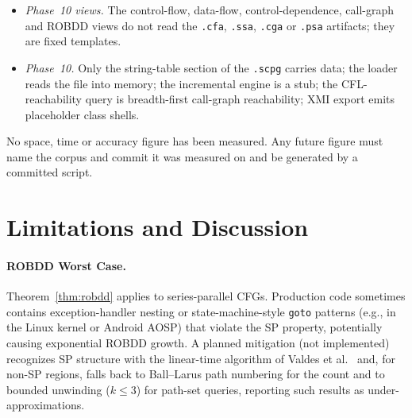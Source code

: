 \documentclass[journal,10pt,twoside]{IEEEtran}
\begin{document}
\begin{itemize}
  fixed templates; the composite-structure, object,
  communication and interaction-overview extractors produce no
  output.  The activity view maps every CFG edge to an
  unguarded control edge, discarding true/false, exception,
  switch and loop-back labels, and produces no decision, merge,
  fork or join nodes.  The sequence view expands calls in the
  wrong order, without combined fragments or nested
  activations, and merges all scenarios into one diagram.  The
  class view drops classes whose names appear in a built-in
  name list.  Record order follows hash-table iteration, so
  output is not deterministic across runs.
\item \emph{Phase~10 views.}  The control-flow, data-flow,
  control-dependence, call-graph and ROBDD views do not read
  the \texttt{.cfa}, \texttt{.ssa}, \texttt{.cga} or
  \texttt{.psa} artifacts; they are fixed templates.
\item \emph{Phase~10.}  Only the string-table section of the
  \texttt{.scpg} carries data; the loader reads the file into
  memory; the incremental engine is a stub; the
  CFL-reachability query is breadth-first call-graph
  reachability; XMI export emits placeholder class shells.
\end{itemize}

\noindent No space, time or accuracy figure has been measured.
Any future figure must name the corpus and commit it was
measured on and be generated by a committed script.

\section{Limitations and Discussion}\label{sec:limits}

\paragraph{ROBDD Worst Case.}
Theorem~\ref{thm:robdd} applies to series-parallel CFGs.
Production code sometimes contains exception-handler
nesting or state-machine-style \texttt{goto} patterns
(e.g., in the Linux kernel or Android AOSP) that violate
the SP property, potentially causing exponential ROBDD
growth.  A planned mitigation (not implemented) recognizes
SP structure with the linear-time algorithm of Valdes et
al.~\cite{valdes79} and, for non-SP regions, falls back to
Ball--Larus path numbering for the count and to bounded
unwinding ($k \le 3$) for path-set queries, reporting such
results as under-approximations.
\end{document}
